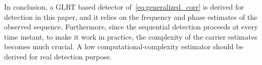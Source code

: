 In conclusion, a GLRT based detector of~\eqref{eq:generalized_corr} is derived for detection in this paper, and it relies on the frequency and phase estimates of the observed sequence.
Furthermore, since the sequential detection proceeds at every time instant, to make it work in practice, the complexity of the carrier estimates becomes
much crucial. A low computational-complexity estimator should be derived for real detection purpose.

%
% 